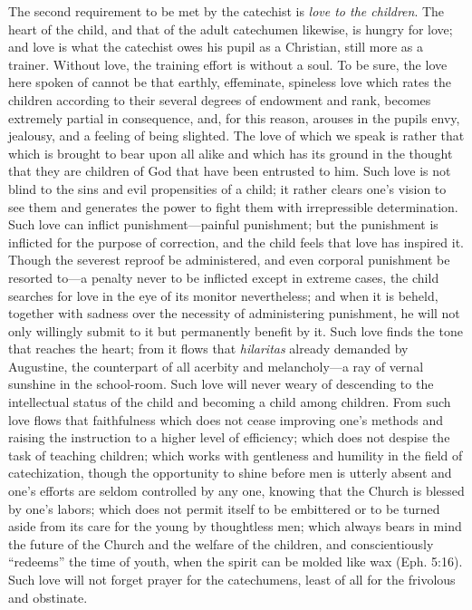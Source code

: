 The second requirement to be met by the catechist is \emph{love to the children}. The heart of the child, and that of the adult catechumen likewise, is hungry for love; and love is what the catechist owes his pupil as a Christian, still more as a trainer. Without love, the training effort is without a soul. To be sure, the love here spoken of cannot be that earthly, effeminate, spineless love which rates the children according to their several degrees of endowment and rank, becomes extremely partial in consequence, and, for this reason, arouses in the pupils envy, jealousy, and a feeling of being slighted. The love of which we speak is rather that which is brought to bear upon all alike and which has its ground in the thought that they are children of God that have been entrusted to him. Such love is not blind to the sins and evil propensities of a child; it rather clears one’s vision to see them and generates the power to fight them with irrepressible determination. Such love can inflict punishment—painful punishment; but the punishment is inflicted for the purpose of correction, and the child feels that love has inspired it. Though the severest reproof be administered, and even corporal punishment be resorted to—a penalty never to be inflicted except in extreme cases, the child searches for love in the eye of its monitor nevertheless; and when it is beheld, together with sadness over the necessity of administering punishment, he will not only willingly submit to it but permanently benefit by it. Such love finds the tone that reaches the heart; from it flows that \emph{hilaritas} already demanded by Augustine, the counterpart of all acerbity and melancholy—a ray of vernal sunshine in the school-room. Such love will never weary of descending to the intellectual status of the child and becoming a child among children. From such love flows that faithfulness which does not cease improving one’s methods and raising the instruction to a higher level of efficiency; which does not despise
the task of teaching children; which works with gentleness and humility in the field of catechization, though the opportunity to shine before men is utterly absent and one’s efforts are seldom controlled by any one, knowing that the Church is blessed by one’s labors; which does not permit itself to be embittered or to be turned aside from its care for the young by thoughtless men; which always bears in mind the future of the Church and the welfare of the children, and conscientiously “redeems” the time of youth, when the spirit can be molded like wax (Eph. 5:16). Such love will not forget prayer for the catechumens, least of all for the frivolous and obstinate.

